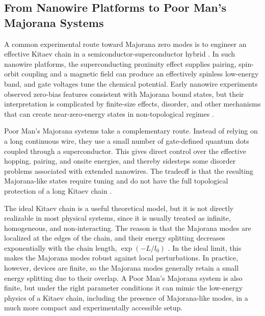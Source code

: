 \subsection{From Nanowire Platforms to Poor Man's Majorana Systems\newline}
A common experimental route toward Majorana zero modes is to engineer an effective Kitaev chain in a semiconductor-superconductor hybrid \cite{aguadoNewTrendsPlatforms2024,aliceaNewDirectionsPursuit2012,sarmaMajoranaZeroModes2015}. In such nanowire platforms, the superconducting proximity effect supplies pairing, spin-orbit coupling and a magnetic field can produce an effectively spinless low-energy band, and gate voltages tune the chemical potential. Early nanowire experiments observed zero-bias features consistent with Majorana bound states, but their interpretation is complicated by finite-size effects, disorder, and other mechanisms that can create near-zero-energy states in non-topological regimes \cite{mourikSignaturesMajoranaFermions2012,sarmaMajoranaZeroModes2015}.

Poor Man's Majorana systems take a complementary route. Instead of relying on a long continuous wire, they use a small number of gate-defined quantum dots coupled through a superconductor. This gives direct control over the effective hopping, pairing, and onsite energies, and thereby sidesteps some disorder problems associated with extended nanowires. The tradeoff is that the resulting Majorana-like states require tuning and do not have the full topological protection of a long Kitaev chain \cite{leijnseParityQubitsPoor2012,dvirRealizationMinimalKitaev2023,svenssonQuantumDotBased2024,aguadoNewTrendsPlatforms2024}.


The ideal Kitaev chain is a useful theoretical model, but it is not directly realizable in most physical systems, since it is usually treated as infinite, homogeneous, and non-interacting. The reason is that the Majorana modes are localized at the edges of the chain, and their energy splitting decreases exponentially with the chain length, $\exp(-L/l_{0})$ \cite{kitaevUnpairedMajoranaFermions2001}. In the ideal limit, this makes the Majorana modes robust against local perturbations. In practice, however, devices are finite, so the Majorana modes generally retain a small energy splitting due to their overlap. A Poor Man's Majorana system is also finite, but under the right parameter conditions it can mimic the low-energy physics of a Kitaev chain, including the presence of Majorana-like modes, in a much more compact and experimentally accessible setup.
 
